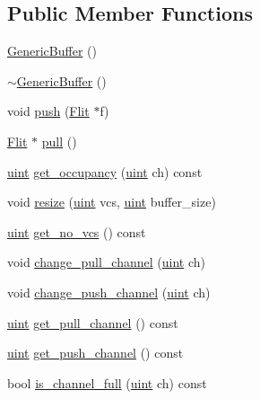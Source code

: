 \subsection*{Public Member Functions}
\begin{CompactItemize}
\item 
\hyperlink{classGenericBuffer_4281e7a40133d057f6cfad3b715084b0}{GenericBuffer} ()
\item 
\hyperlink{classGenericBuffer_d9a4c588a03bdf24a6fe586376d17e0c}{$\sim$GenericBuffer} ()
\item 
void \hyperlink{classGenericBuffer_c5a0781106485f9567898b49021f6346}{push} (\hyperlink{classFlit}{Flit} $\ast$f)
\item 
\hyperlink{classFlit}{Flit} $\ast$ \hyperlink{classGenericBuffer_6ce6f151eb6f65ec1fffafffb04a8f0e}{pull} ()
\item 
\hyperlink{outputBuffer_8h_91ad9478d81a7aaf2593e8d9c3d06a14}{uint} \hyperlink{classGenericBuffer_f2f85cf979616bab9dad5373d25d7813}{get\_\-occupancy} (\hyperlink{outputBuffer_8h_91ad9478d81a7aaf2593e8d9c3d06a14}{uint} ch) const 
\item 
void \hyperlink{classGenericBuffer_d2b0822ec5f56ebea495b19562028f4c}{resize} (\hyperlink{outputBuffer_8h_91ad9478d81a7aaf2593e8d9c3d06a14}{uint} vcs, \hyperlink{outputBuffer_8h_91ad9478d81a7aaf2593e8d9c3d06a14}{uint} buffer\_\-size)
\item 
\hyperlink{outputBuffer_8h_91ad9478d81a7aaf2593e8d9c3d06a14}{uint} \hyperlink{classGenericBuffer_528c7b73ffbb3870cab0fc999a01a024}{get\_\-no\_\-vcs} () const 
\item 
void \hyperlink{classGenericBuffer_6d7fe4a638dc7eb0358c3490bf8d2cf4}{change\_\-pull\_\-channel} (\hyperlink{outputBuffer_8h_91ad9478d81a7aaf2593e8d9c3d06a14}{uint} ch)
\item 
void \hyperlink{classGenericBuffer_31e2c8b678d219fcc5d6e351f2f8623c}{change\_\-push\_\-channel} (\hyperlink{outputBuffer_8h_91ad9478d81a7aaf2593e8d9c3d06a14}{uint} ch)
\item 
\hyperlink{outputBuffer_8h_91ad9478d81a7aaf2593e8d9c3d06a14}{uint} \hyperlink{classGenericBuffer_3e87475edf8151591ef57f9ca4cd9a25}{get\_\-pull\_\-channel} () const 
\item 
\hyperlink{outputBuffer_8h_91ad9478d81a7aaf2593e8d9c3d06a14}{uint} \hyperlink{classGenericBuffer_3b5ed41f7cee8ba1fa059aaa0b9db55a}{get\_\-push\_\-channel} () const 
\item 
bool \hyperlink{classGenericBuffer_91aa6e2af039aa6c1a50a599fc3f3203}{is\_\-channel\_\-full} (\hyperlink{outputBuffer_8h_91ad9478d81a7aaf2593e8d9c3d06a14}{uint} ch) const 

\end{CompactItemize}
